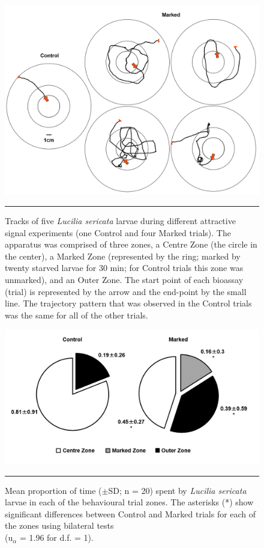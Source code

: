 \begin{figure}[ht]
	\centering
		\includegraphics[width=0.9 \textwidth]{Figures/fig2.png}
		\rule{35em}{0.5pt}
	\caption[Trail]{Tracks of five \textit{Lucilia sericata} larvae during different attractive signal experiments (one Control and four Marked trials). The apparatus was comprised of three zones, a Centre Zone (the circle in the center), a Marked Zone (represented by the ring; marked by twenty starved larvae for 30 min; for Control trials this zone was unmarked), and an Outer Zone. The start point of each bioassay (trial) is represented by the arrow and the end-point by the small line. The trajectory pattern that was observed in the Control trials was the same for all of the other trials.}
	\label{fig:trail}

\end{figure}

\begin{figure}[ht]
	\centering
		\includegraphics[width=0.9 \textwidth]{Figures/fig3.png}
		\rule{35em}{0.5pt}
	\caption[Proportion]{Mean proportion of time ($\pm$SD; n = 20) spent by \textit{Lucilia sericata} larvae in each of the behavioural trial zones. The asterisks (*) show significant differences between Control and Marked trials for each of the zones using bilateral tests \\(u$_{\alpha}$ = 1.96 for d.f. = 1).}
	\label{fig:proportion}
\end{figure}    
    
